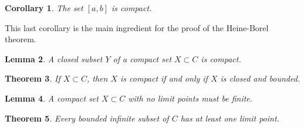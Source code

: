 \documentclass{amsart}
\newtheorem{theorem}{Theorem}
\newtheorem{lemma}[theorem]{Lemma}
\newtheorem{corollary}[theorem]{Corollary}
\newcommand{\1}{\mathds{1}}
\numberwithin{equation}{section}
\numberwithin{theorem}{section}
\begin{document}
\begin{corollary}
The set $[a, b]$ is compact.
\end{corollary}

This last corollary is the main ingredient for the proof of the Heine-Borel theorem.

\begin{lemma}
A closed subset $Y$ of a compact set $X \subset C$ is compact.
\end{lemma}

\begin{theorem} If $X \subset C$, then  $X$ is compact if and only if $X$ is closed and bounded.
\end{theorem}


\begin{lemma}
A compact set $X \subset C$ with no limit points must be finite.
\end{lemma}

\begin{theorem} Every bounded infinite subset of $C$ has at least one limit point.
\end{theorem}
\end{document}
